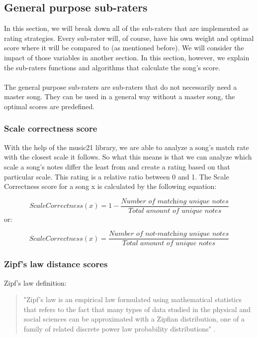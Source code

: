 \documentclass[a4paper]{article}
\begin{document}
 
\subsection{General purpose sub-raters}
In this section, we will break down all of the sub-raters that are implemented as rating strategies. Every sub-rater will, of course, have his own weight and optimal score where it will be compared to (as mentioned before). We will consider the impact of those variables in another section. In this section, however, we explain the sub-raters functions and algorithms that calculate the song's score. 
\\\\
The general purpose sub-raters are sub-raters that do not necessarily need a master song. They can be used in a general way without a master song, the optimal scores are predefined.


\subsubsection{Scale correctness score} \label{subrater:scale_corr}
With the help of the music21 library, we are able to analyze a song's match rate with the closest scale it follows. So what this means is that we can analyze which scale a song's notes differ the least from and create a rating based on that particular scale. This rating is a relative ratio between 0 and 1. The Scale Correctness score for a song x is calculated by the following equation:

\[ ScaleCorrectness(x) = 1 -  \frac{\textit{Number of matching unique notes}}{\textit{Total amount of unique notes}}  \]
or:

\[ ScaleCorrectness(x) =  \frac{\textit{Number of not-matching unique notes}}{\textit{Total amount of unique notes}}  \]


\subsubsection{Zipf's law distance scores}
Zipf's law definition: 
\begin{quotation}
	"Zipf's law is an empirical law formulated using mathematical statistics that refers to the fact that many types of data studied in the physical and social sciences can be approximated with a Zipfian distribution, one of a family of related discrete power law probability distributions" \cite{Zipfslaw}.
\end{quotation}
\end{document}
